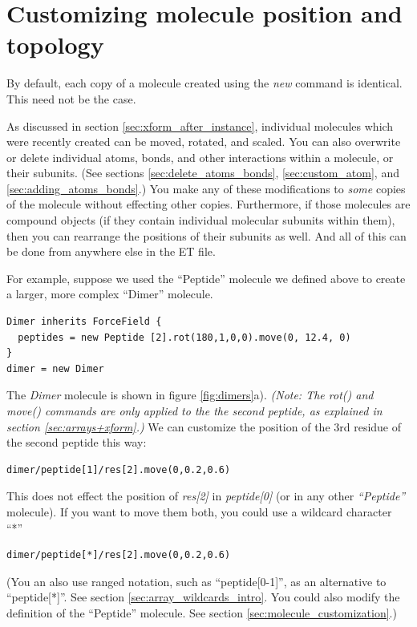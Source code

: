 \documentclass[11pt]{article}
\begin{document}
\section{Customizing molecule position and topology}
\label{sec:custom_xform}
By default, each copy of a molecule created using the \textit{new}
command is identical.  This need not be the case.

As discussed in section \ref{sec:xform_after_instance},
individual molecules which were recently created
can be moved, rotated, and scaled.
You can also overwrite or delete individual atoms, 
bonds, and other interactions within a molecule, or their subunits.
(See sections 
\ref{sec:delete_atoms_bonds}, 
\ref{sec:custom_atom}, and \ref{sec:adding_atoms_bonds}.)
You make any of these modifications to \textit{some} copies 
of the molecule without effecting other copies.
Furthermore, if those molecules are compound objects 
(if they contain individual molecular subunits within them),
then you can rearrange the positions of their subunits as well.
And all of this can be done from anywhere else in the ET file.

For example, suppose we used the ``Peptide'' molecule we defined above
to create a larger, more complex ``Dimer'' molecule.
\begin{verbatim}
Dimer inherits ForceField {
  peptides = new Peptide [2].rot(180,1,0,0).move(0, 12.4, 0)
}
dimer = new Dimer
\end{verbatim}
The \textit{Dimer} molecule is shown in figure \ref{fig:dimers}a). 
\textit{(Note: The rot() and move() commands are only applied to the
the second peptide, as explained in section \ref{sec:arrays+xform}.)}
We can customize the position of the 3rd residue of the second peptide this way:
\begin{verbatim}
dimer/peptide[1]/res[2].move(0,0.2,0.6)
\end{verbatim}
This does not effect the position of \textit{res[2]} in \textit{peptide[0]}
(or in any other \textit{``Peptide''} molecule).
If you want to move them both, you could use a wildcard character ``*''
\begin{verbatim}
dimer/peptide[*]/res[2].move(0,0.2,0.6)
\end{verbatim}
(You an also use ranged notation, such as ``peptide[0-1]'',
 as an alternative to ``peptide[*]''. 
See section \ref{sec:array_wildcards_intro}.
You could also modify the definition of the ``Peptide'' molecule.  
See section \ref{sec:molecule_customization}.)
\end{document}
